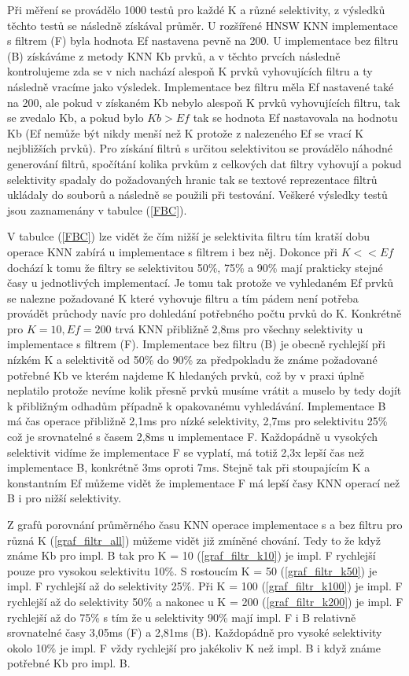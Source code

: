 \documentclass[czech,semestral,dept460,male,csharp,cpdeclaration]{diploma}
\begin{document}
		Při měření se provádělo 1000 testů pro každé K a různé selektivity, z výsledků těchto testů se následně získával průměr. U rozšířené HNSW KNN implementace s filtrem (F) byla hodnota Ef nastavena pevně na 200. U implementace bez filtru (B) získáváme z metody KNN Kb prvků, a v těchto prvcích následně kontrolujeme zda se v nich nachází alespoň K prvků vyhovujících filtru a ty následně vracíme jako výsledek. Implementace bez filtru měla Ef nastavené také na 200, ale pokud v získaném Kb nebylo alespoň K prvků vyhovujících filtru, tak se zvedalo Kb, a pokud bylo $Kb > Ef$ tak se hodnota Ef nastavovala na hodnotu Kb (Ef nemůže být nikdy menší než K protože z nalezeného Ef se vrací K nejbližších prvků). Pro získání filtrů s určitou selektivitou se provádělo náhodné generování filtrů, spočítání kolika prvkům z celkových dat filtry vyhovují a pokud selektivity spadaly do požadovaných hranic tak se textové reprezentace filtrů ukládaly do souborů a následně se použili při testování. Veškeré výsledky testů jsou zaznamenány v tabulce (\ref{FBC}).
		
		V tabulce (\ref{FBC}) lze vidět že čím nižší je selektivita filtru tím kratší dobu operace KNN zabírá u implementace s filtrem i bez něj. Dokonce při $K << Ef$ dochází k tomu že filtry se selektivitou 50\%, 75\% a 90\% mají prakticky stejné časy u jednotlivých implementací. Je tomu tak protože ve vyhledaném Ef prvků se nalezne požadované K které vyhovuje filtru a tím pádem není potřeba provádět průchody navíc pro dohledání potřebného počtu prvků do K. Konkrétně pro $K = 10, Ef = 200$ trvá KNN přibližně 2,8ms pro všechny selektivity u implementace s filtrem (F). Implementace bez filtru (B) je obecně rychlejší při nízkém K a selektivitě od 50\% do 90\% za předpokladu že známe požadované potřebné Kb ve kterém najdeme K hledaných prvků, což by v praxi úplně neplatilo protože nevíme kolik přesně prvků musíme vrátit a muselo by tedy dojít k přibližným odhadům případně k opakovanému vyhledávání. Implementace B má čas operace přibližně 2,1ms pro nízké selektivity, 2,7ms pro selektivitu 25\% což je srovnatelné s časem 2,8ms u implementace F. Každopádně u vysokých selektivit vidíme že implementace F se vyplatí, má totiž 2,3x lepší čas než implementace B, konkrétně 3ms oproti 7ms. Stejně tak při stoupajícím K a konstantním Ef můžeme vidět že implementace F má lepší časy KNN operací než B i pro nižší selektivity.
		
		Z grafů porovnání průměrného času KNN operace implementace s a bez filtru pro různá K (\ref{graf_filtr_all}) můžeme vidět již zmíněné chování. Tedy to že když známe Kb pro impl. B tak pro K = 10 (\ref{graf_filtr_k10}) je impl. F rychlejší pouze pro vysokou selektivitu 10\%. S rostoucím K = 50 (\ref{graf_filtr_k50}) je impl. F rychlejší až do selektivity  25\%. Při K = 100 (\ref{graf_filtr_k100}) je impl. F rychlejší až do selektivity 50\% a nakonec u K = 200 (\ref{graf_filtr_k200}) je impl. F rychlejší až do 75\% s tím že u selektivity 90\% mají impl. F i B relativně srovnatelné časy 3,05ms (F) a 2,81ms (B). Každopádně pro vysoké selektivity okolo 10\% je impl. F vždy rychlejší pro jakékoliv K než impl. B i když známe potřebné Kb pro impl. B.
		
\end{document}
